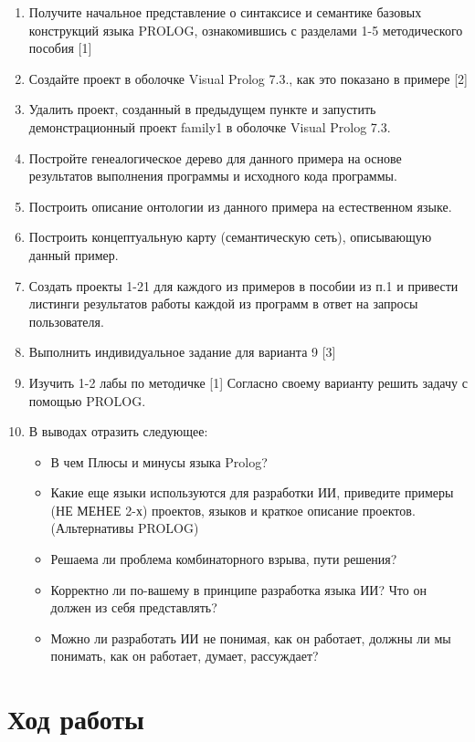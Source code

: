 \documentclass[14pt,a4paper,report]{report}
\begin{document}
\begin{enumerate}
	\item Получите начальное представление о синтаксисе и семантике базовых конструкций языка PROLOG, ознакомившись с разделами 1-5 методического пособия [1]
	\item Создайте проект в оболочке Visual Prolog 7.3., как это показано в примере [2]
	\item Удалить проект, созданный в предыдущем пункте и запустить демонстрационный проект family1 в
	оболочке Visual Prolog 7.3.
	\item Постройте генеалогическое дерево для данного примера на основе результатов выполнения программы и исходного кода программы.
	\item Построить описание онтологии из данного примера на естественном языке. 
	\item Построить концептуальную карту (семантическую сеть), описывающую данный пример.
	\item Создать проекты 1-21 для каждого из примеров в пособии из п.1 и привести листинги результатов работы каждой из программ в ответ на запросы пользователя. 
	\item Выполнить индивидуальное задание для варианта 9 [3]
	\item Изучить 1-2 лабы по методичке [1] Согласно своему варианту решить задачу с помощью PROLOG.
	\item В выводах отразить следующее:
	\begin{itemize}
		\item В чем Плюсы и минусы языка Prolog?
		\item Какие еще языки используются для разработки ИИ, приведите примеры (НЕ МЕНЕЕ 2-х) проектов, языков и краткое описание проектов. (Альтернативы PROLOG)
		\item Решаема ли проблема комбинаторного взрыва, пути решения?
		\item Корректно ли по-вашему в принципе разработка языка ИИ? Что он должен из себя представлять?
		\item Можно ли разработать ИИ не понимая, как он работает, должны ли мы понимать, как он работает, думает, рассуждает?
	\end{itemize}
\end{enumerate}


\clearpage

\section{Ход работы}
\end{document}
